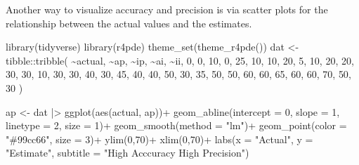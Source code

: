 \documentclass[
  letterpaper,
]{book}
\newenvironment{Shaded}{\begin{snugshade}}{\end{snugshade}}
\newcommand{\AttributeTok}[1]{\textcolor[rgb]{0.40,0.45,0.13}{#1}}
\newcommand{\DecValTok}[1]{\textcolor[rgb]{0.68,0.00,0.00}{#1}}
\newcommand{\FunctionTok}[1]{\textcolor[rgb]{0.28,0.35,0.67}{#1}}
\newcommand{\NormalTok}[1]{\textcolor[rgb]{0.00,0.23,0.31}{#1}}
\newcommand{\OtherTok}[1]{\textcolor[rgb]{0.00,0.23,0.31}{#1}}
\newcommand{\SpecialCharTok}[1]{\textcolor[rgb]{0.37,0.37,0.37}{#1}}
\newcommand{\StringTok}[1]{\textcolor[rgb]{0.13,0.47,0.30}{#1}}
\begin{document}
Another way to visualize accuracy and precision is via scatter plots for
the relationship between the actual values and the estimates.

\begin{Shaded}
\begin{Highlighting}[]
\FunctionTok{library}\NormalTok{(tidyverse)}
\FunctionTok{library}\NormalTok{(r4pde)}
\FunctionTok{theme\_set}\NormalTok{(}\FunctionTok{theme\_r4pde}\NormalTok{())}
\NormalTok{dat }\OtherTok{\textless{}{-}} 
\NormalTok{tibble}\SpecialCharTok{::}\FunctionTok{tribble}\NormalTok{(}
  \SpecialCharTok{\textasciitilde{}}\NormalTok{actual,   }\SpecialCharTok{\textasciitilde{}}\NormalTok{ap,   }\SpecialCharTok{\textasciitilde{}}\NormalTok{ip,   }\SpecialCharTok{\textasciitilde{}}\NormalTok{ai,   }\SpecialCharTok{\textasciitilde{}}\NormalTok{ii,}
        \DecValTok{0}\NormalTok{,     }\DecValTok{0}\NormalTok{,    }\DecValTok{10}\NormalTok{,     }\DecValTok{0}\NormalTok{,    }\DecValTok{25}\NormalTok{,}
       \DecValTok{10}\NormalTok{,    }\DecValTok{10}\NormalTok{,    }\DecValTok{20}\NormalTok{,     }\DecValTok{5}\NormalTok{,    }\DecValTok{10}\NormalTok{,}
       \DecValTok{20}\NormalTok{,    }\DecValTok{20}\NormalTok{,    }\DecValTok{30}\NormalTok{,    }\DecValTok{30}\NormalTok{,    }\DecValTok{10}\NormalTok{,}
       \DecValTok{30}\NormalTok{,    }\DecValTok{30}\NormalTok{,    }\DecValTok{40}\NormalTok{,    }\DecValTok{30}\NormalTok{,    }\DecValTok{45}\NormalTok{,}
       \DecValTok{40}\NormalTok{,    }\DecValTok{40}\NormalTok{,    }\DecValTok{50}\NormalTok{,    }\DecValTok{30}\NormalTok{,    }\DecValTok{35}\NormalTok{,}
       \DecValTok{50}\NormalTok{,    }\DecValTok{50}\NormalTok{,    }\DecValTok{60}\NormalTok{,    }\DecValTok{60}\NormalTok{,    }\DecValTok{65}\NormalTok{,}
       \DecValTok{60}\NormalTok{,    }\DecValTok{60}\NormalTok{,    }\DecValTok{70}\NormalTok{,    }\DecValTok{50}\NormalTok{,    }\DecValTok{30}
\NormalTok{  )}

\NormalTok{ap }\OtherTok{\textless{}{-}}\NormalTok{ dat }\SpecialCharTok{|\textgreater{}} 
  \FunctionTok{ggplot}\NormalTok{(}\FunctionTok{aes}\NormalTok{(actual, ap))}\SpecialCharTok{+}
  \FunctionTok{geom\_abline}\NormalTok{(}\AttributeTok{intercept =} \DecValTok{0}\NormalTok{, }\AttributeTok{slope =} \DecValTok{1}\NormalTok{, }
              \AttributeTok{linetype =} \DecValTok{2}\NormalTok{, }\AttributeTok{size =} \DecValTok{1}\NormalTok{)}\SpecialCharTok{+}
    \FunctionTok{geom\_smooth}\NormalTok{(}\AttributeTok{method =} \StringTok{"lm"}\NormalTok{)}\SpecialCharTok{+}
   \FunctionTok{geom\_point}\NormalTok{(}\AttributeTok{color =} \StringTok{"\#99cc66"}\NormalTok{, }\AttributeTok{size =} \DecValTok{3}\NormalTok{)}\SpecialCharTok{+}
   \FunctionTok{ylim}\NormalTok{(}\DecValTok{0}\NormalTok{,}\DecValTok{70}\NormalTok{)}\SpecialCharTok{+}
  \FunctionTok{xlim}\NormalTok{(}\DecValTok{0}\NormalTok{,}\DecValTok{70}\NormalTok{)}\SpecialCharTok{+}
  \FunctionTok{labs}\NormalTok{(}\AttributeTok{x =} \StringTok{"Actual"}\NormalTok{, }\AttributeTok{y =} \StringTok{"Estimate"}\NormalTok{,}
       \AttributeTok{subtitle =} \StringTok{"High Acccuracy High Precision"}\NormalTok{)}


\end{Highlighting}
\end{Shaded}
\end{document}
